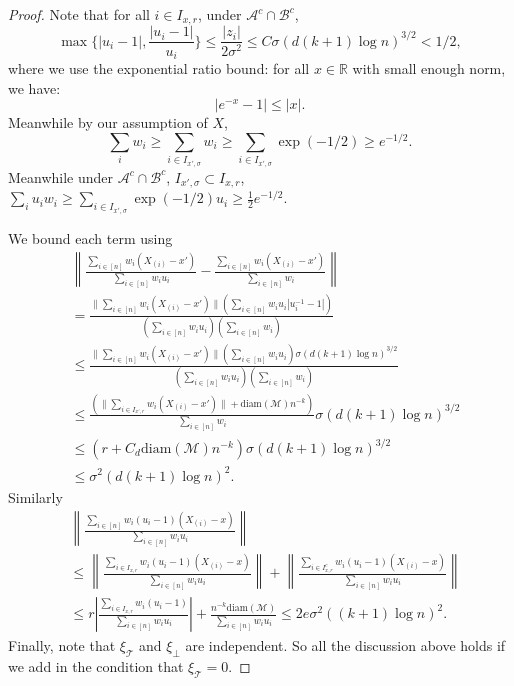 \documentclass[10pt,a4paper]{amsart}
\def\calM{\mathcal{M}}
\begin{document}
\begin{proof}
Note that for all $i\in I_{x,r}$, under $\mathcal{A}^c\cap \mathcal{B}^c$, 
\[
\max\{|u_i-1|,\frac{|u_i-1|}{u_i}\}\leq \frac{|z_i|}{2\sigma^2}\leq C\sigma (d(k+1)\log n)^{3/2}<1/2,
\]
where we use the exponential ratio bound: 
for all \( x \in \mathbb{R} \) with small enough norm, we have:
\[
\left| e^{-x} - 1 \right| \le |x|.
\]
Meanwhile by our assumption of $X$,
\[
\sum_{i}w_i\geq  \sum_{i\in I_{x',\sigma}}w_i\geq 
\sum_{i\in I_{x',\sigma}}\exp(-1/2)
\geq e^{-1/2}.
\]
Meanwhile under $\mathcal{A}^c\cap \mathcal{B}^c$, $I_{x',\sigma}\subset I_{x,r}$, $\sum_i u_i w_i\geq 
\sum_{i\in I_{x',\sigma}}\exp(-1/2) u_i\geq \frac12 e^{-1/2}$. 

We bound each term using 
\begin{align*}
&\left\|\frac{\sum_{i\in [n]} w_i (X_{(i)}-x')}{\sum_{i\in [n]} w_iu_i}-\frac{\sum_{i\in [n]} w_i(X_{(i)}-x')}{\sum_{i\in [n]} w_i}\right\|\\
&=\frac{\|\sum_{i\in [n]} w_i (X_{(i)}-x')\|(\sum_{i\in [n]}w_i u_i|u_i^{-1}-1|)}{(\sum_{i\in [n]}w_i u_i)(\sum_{i\in [n]}w_i)}\\
&\leq \frac{\|\sum_{i\in [n]} w_i (X_{(i)}-x')\|(\sum_{i\in [n]}w_iu_i)\sigma (d(k+1)\log n)^{3/2}}{(\sum_{i\in [n]}w_i u_i)(\sum_{i\in [n]}w_i)}\\
&\leq \frac{(\|\sum_{i\in I_{x',r}} w_i (X_{(i)}-x')\|+\text{diam}(\calM)n^{-k})}{\sum_{i\in [n]}w_i}\sigma (d(k+1)\log n)^{3/2}\\
&\leq \left(r+C_d\text{diam}(\calM)n^{-k}\right)\sigma (d(k+1)\log n)^{3/2}\\
&\leq \sigma^2  (d(k+1)\log n)^2. 
\end{align*}
Similarly
\begin{align*}
&\left\|\frac{\sum_{i\in [n]} w_i(u_i-1) (X_{(i)}-x)}{\sum_{i\in [n]} w_iu_i}\right\|\\
&\leq \left\|\frac{\sum_{i\in I_{x,r}} w_i(u_i-1) (X_{(i)}-x)}{\sum_{i\in [n]} w_iu_i}\right\|+\left\|\frac{\sum_{i\in I^c_{x,r}} w_i(u_i-1) (X_{(i)}-x)}{\sum_{i\in [n]} w_iu_i}\right\|\\
&\leq r\left|\frac{\sum_{i\in I_{x,r}} w_i(u_i-1) }{\sum_{i\in [n]} w_iu_i}\right|+\frac{n^{-k}\text{diam}(\calM)}{\sum_{i\in [n]} w_iu_i}\leq 2e\sigma^2  ((k+1)\log n)^2.
\end{align*}
Finally, note that $\xi_{\mathcal{T}}$ and $\xi_\bot$ are independent. So all the discussion above holds if we add in the condition that $\xi_{\mathcal{T}}=0$. 
\end{proof}
\end{document}
